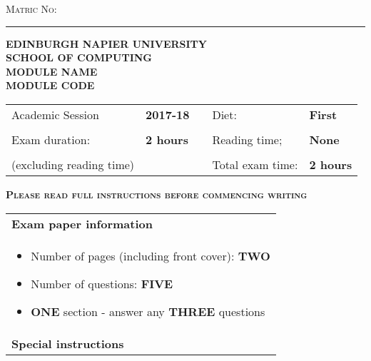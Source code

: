 \documentclass[11pt, a4paper, twosize]{article}
\newcommand{\blank}[1]{\hspace*{#1}}
\newcommand*{\inputline}[1][3em]{\rule[0.5ex]{#1}{0.55pt}}
\begin{document}
\begin{titlepage}
\vspace*{1cm}

\textsc{Matric No:} \inputline[10em]

\begin{center}

\textsc{\Large {\bf{EDINBURGH NAPIER UNIVERSITY}}}\\[0.5cm]
\textsc{\Large {\bf{SCHOOL OF COMPUTING}}}\\[1.5cm]


\textsc{\Large {\bf{MODULE NAME}}}\\[1cm]
\textsc{\Large {\bf{MODULE CODE}}}\\[1.5cm]

\end{center}

\begin{table}[H]
\centering
\begin{tabular}{lllll}
Academic Session         & \textbf{2017-18} &  \blank{2cm} & Diet:& \textbf{First}   \\
     & & & \\
Exam duration:           & \textbf{2 hours} &  & Reading time;    & \textbf{None}    \\
     & & & \\
(excluding reading time) &                  &  & Total exam time: & \textbf{2 hours}
\end{tabular}
\end{table}

\vspace{2cm}
\textsc{{\bf{Please read full instructions before commencing writing}}}

\begin{table}[H]
\centering
\begin{tabular}{|p{14cm}|}
\hline

{\bf{Exam paper information}}\\

    \begin{itemize}
      \item Number of pages (including front cover): {\bf{TWO}}
      \item Number of questions: {\bf{FIVE}}
      \item {\bf{ONE}} section - answer any {\bf{THREE}} questions
    \end{itemize} \\

\hline
{\bf{Special instructions}}\\


\end{tabular}
\end{table}
\end{titlepage}
\end{document}
